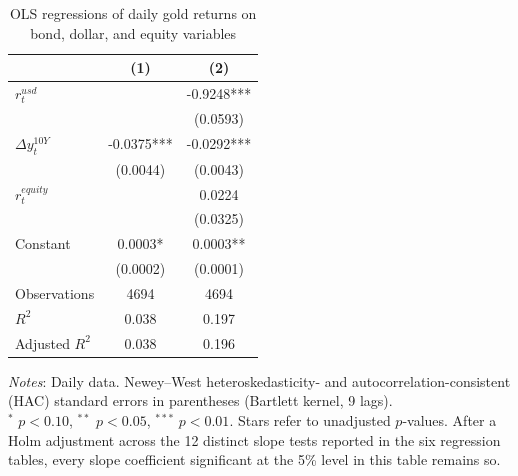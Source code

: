 \begin{table}[H]
\centering
\caption{OLS regressions of daily gold returns on bond, dollar, and equity variables}
\label{tab:ols_gold_bond}
\begin{tabular}{lcc}
\toprule
 & (1) & (2) \\
\midrule
$r^{usd}_t$ &  & -0.9248*** \\
 &  & (0.0593) \\
$\Delta y^{10Y}_t$ & -0.0375*** & -0.0292*** \\
 & (0.0044) & (0.0043) \\
$r^{equity}_t$ &  & 0.0224 \\
 &  & (0.0325) \\
Constant & 0.0003* & 0.0003** \\
 & (0.0002) & (0.0001) \\
Observations & 4694 & 4694 \\
$R^2$ & 0.038 & 0.197 \\
Adjusted $R^2$ & 0.038 & 0.196 \\
\bottomrule
\end{tabular}

\vspace{0.2cm}
\begin{minipage}{0.9\textwidth}
\footnotesize
\textit{Notes}: Daily data. Newey--West heteroskedasticity- and autocorrelation-consistent (HAC) standard errors in parentheses (Bartlett kernel, 9 lags).\\
$^*$ $p<0.10$, $^{**}$ $p<0.05$, $^{***}$ $p<0.01$. Stars refer to unadjusted $p$-values. After a Holm adjustment across the 12 distinct slope tests reported in the six regression tables, every slope coefficient significant at the 5\% level in this table remains so.
\end{minipage}
\end{table}

